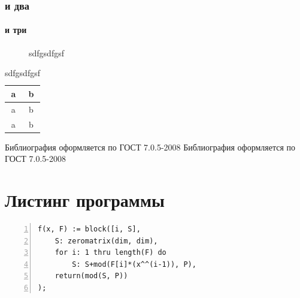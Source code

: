 \documentclass[14pt,Diplom]{diplomwork}
\newcommand{\alert}[1]{{\color{red}#1}}
\begin{document}
\subsection{и два}
\subsubsection{и три}
\begin{figure}[H]
	\caption{sdfgsdfgsf}
	\label{fig:wqewe}
\end{figure}

\begin{table}[H]
	\caption{sdfgsdfgsf}
	\label{tbl:wqewe}
	\begin{tabular}{|c|c|}
		\hline
		a & b \\
		\hline
		a & b \\
		\hline
		a & b \\
		\hline
	\end{tabular}
\end{table}





\begin{thebibliography}{99}
 \alert{Библиография оформляется по ГОСТ 7.0.5-2008} 
 \alert{Библиография оформляется по ГОСТ 7.0.5-2008} 
\end{thebibliography}

\APPENDIX
\chapter{Листинг программы}
\linespread{1}

\begin{Verbatim}[numbers=left,firstnumber=last,fontsize=\small]
f(x, F) := block([i, S], 
    S: zeromatrix(dim, dim), 
    for i: 1 thru length(F) do
        S: S+mod(F[i]*(x^^(i-1)), P), 
    return(mod(S, P))
);
\end{Verbatim}  
\end{document}
